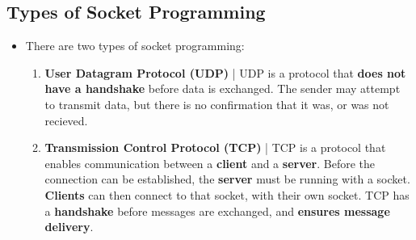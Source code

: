 \documentclass{article}
\begin{document}
    \subsection*{Types of Socket Programming}
    \begin{itemize}
        \item There are two types of socket programming:
        \begin{enumerate}
            \item \textbf{User Datagram Protocol (UDP)} | UDP is a protocol that \textbf{does not have a handshake} before data is exchanged. The sender may attempt to transmit data, but there is no confirmation that it was, or was not recieved.
            \item \textbf{Transmission Control Protocol (TCP)} | TCP is a protocol that enables communication between a \textbf{client} and a \textbf{server}. Before the connection can be established, the \textbf{server} must be running with a socket. \textbf{Clients} can then connect to that socket, with their own socket. TCP has a \textbf{handshake} before messages are exchanged, and \textbf{ensures message delivery}.
        \end{enumerate}
    \end{itemize}
\end{document}
